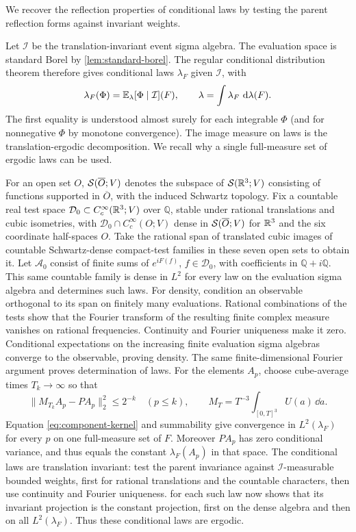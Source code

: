 We recover the reflection properties of conditional laws by
testing the parent reflection forms against invariant weights.

Let $\mathcal I$ be the translation-invariant event sigma algebra.
The evaluation space is standard Borel by \cref{lem:standard-borel}.
The regular conditional distribution theorem
\cite[Theorems~4.1.16--4.1.17]{Durrett2019} therefore gives conditional laws $\lambda_F$ given $\mathcal I$, with
\begin{equation}\label{eq:component-kernel}
 \lambda_F(\Phi)=\mathbb E_\lambda[\Phi\mid\mathcal I](F),\qquad
 \lambda=\int\lambda_F\,\,\mathrm d\lambda(F).
\end{equation}
The first equality is understood almost surely for each integrable
$\Phi$ (and for nonnegative $\Phi$ by monotone convergence).
The image measure on laws is the translation-ergodic decomposition.
We recall why a single full-measure set of ergodic laws can be used.

For an open set $O$, $\mathcal S(\overline O;V)$ denotes
the subspace of $\mathcal S(\mathbb R^3;V)$ consisting of functions
supported in $\overline O$, with the induced Schwartz topology.
Fix a countable real test space $\mathcal D_0\subset C_c^\infty(\mathbb R^3;V)$
over $\mathbb Q$, stable under rational translations and cubic
isometries, with $\mathcal D_0\cap C_c^\infty(O;V)$ dense
in $\mathcal S(\overline O;V)$ for $\mathbb R^3$ and the six coordinate
half-spaces $O$. Take the rational span of translated cubic images
of countable Schwartz-dense compact-test families in these seven
open sets to obtain it.
Let $\mathcal A_0$ consist of finite sums of $e^{iF(f)}$,
$f\in\mathcal D_0$, with coefficients in $\mathbb Q+i\mathbb Q$.
This same countable family is dense in $L^2$ for every law on the
evaluation sigma algebra and determines such laws. For density,
condition an observable orthogonal to its span on finitely many
evaluations. Rational combinations of the tests show that the
Fourier transform of the resulting finite complex measure vanishes
on rational frequencies. Continuity and Fourier uniqueness make it
zero. Conditional expectations on the increasing finite evaluation
sigma algebras converge to the observable, proving density.
The same finite-dimensional Fourier argument proves determination
of laws. For the elements
$A_p$, choose cube-average times $T_k\to\infty$ so that
\[
 \|M_{T_k}A_p-PA_p\|_2^2\le2^{-k}\quad(p\le k),\qquad
 M_T=T^{-3}\int_{[0,T]^3}U(a)\,\dd a.
\]
Equation \eqref{eq:component-kernel} and summability give convergence
in $L^2(\lambda_F)$ for every $p$ on one full-measure set of $F$.
Moreover $PA_p$ has zero conditional variance, and thus equals
the constant $\lambda_F(A_p)$ in that space. The conditional laws
are translation invariant: test the parent invariance against
$\mathcal I$-measurable bounded weights, first for rational
translations and the countable characters, then use continuity and
Fourier uniqueness.  for each such law now
shows that its invariant projection is the constant projection,
first on the dense algebra and then on all $L^2(\lambda_F)$.
Thus these conditional laws are ergodic.

